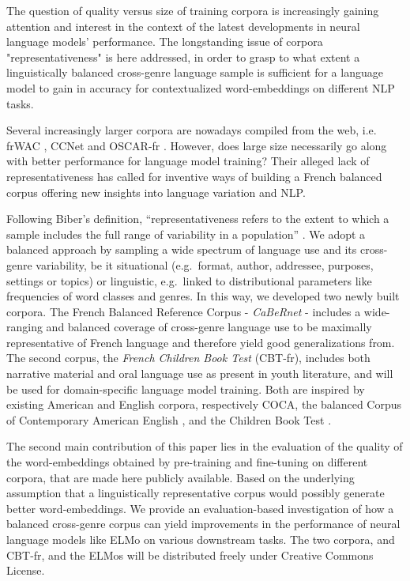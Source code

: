 The question of quality versus size of training corpora is increasingly gaining attention and interest in the context of the latest developments in neural language models' performance.
The longstanding issue of corpora "representativeness" is here addressed, in order to grasp to what extent a linguistically balanced cross-genre language sample is sufficient for a language model to gain in accuracy for contextualized word-embeddings on different NLP tasks.

Several increasingly larger corpora are nowadays compiled from the web, i.e. frWAC \citep{baroni-etal-2009-the}, CCNet \citep{wenzek-etal-2020-ccnet} and OSCAR-fr \citep{ortiz-suarez-etal-2019-asynchronous}. However, does large size necessarily go along with better performance for language model training? Their alleged lack of representativeness has called for inventive ways of building a French balanced corpus offering new insights into language variation and NLP.

Following Biber's definition, “representativeness refers to the extent to which a sample includes the full range of variability in a population” \citep{biber-1993-representativeness}. We adopt a balanced approach by sampling a wide spectrum of language use and its cross-genre variability, be it situational (e.g.\ format, author, addressee, purposes, settings or topics) or linguistic, e.g.\ linked to distributional parameters like frequencies of word classes and genres.
In this way, we developed two newly built corpora. The French Balanced Reference Corpus - \textit{CaBeRnet} - includes a wide-ranging and balanced coverage of cross-genre language use to be maximally representative of French language and therefore yield good generalizations from. The second corpus, the \textit{French Children Book Test} (CBT-fr), includes both narrative material and oral language use as present in youth literature, and will be used for domain-specific language model training. Both are inspired by existing American and English corpora, respectively  COCA, the balanced Corpus of Contemporary American English \citep{davies-2009-the, davies-2010-the}, and the Children Book Test \citep[CBT]{hill-etal-2016-the}.

The second main contribution of this paper lies in the evaluation of the quality of the word-embeddings obtained by pre-training and fine-tuning on different corpora, that are made here publicly available.
Based on the underlying assumption that a linguistically representative corpus would possibly generate better word-embeddings. %
We provide an evaluation-based investigation of how a balanced cross-genre corpus can yield improvements in the performance of neural language models like ELMo \citep{peters-etal-2018-deep} on various downstream tasks.
The two corpora, \Cabernet and CBT-fr, and the ELMos will be distributed freely under Creative Commons License.

